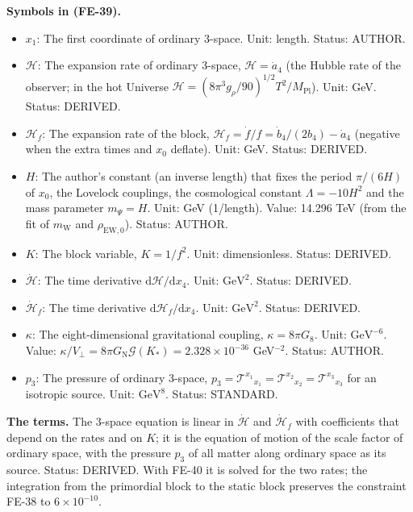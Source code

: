 \documentclass[
  10pt,
]{article}
\providecommand{\tightlist}{%
  \setlength{\itemsep}{0pt}\setlength{\parskip}{0pt}}
\begin{document}
\textbf{Symbols in (FE-39).}

\begin{itemize}
\tightlist
\item
  \(x_1\): The first coordinate of ordinary 3-space. Unit: length.
  Status: AUTHOR.
\item
  \(\mathcal{H}\): The expansion rate of ordinary 3-space,
  \(\mathcal{H} = \dot a_4\) (the Hubble rate of the observer; in the
  hot Universe
  \(\mathcal{H} = (8\pi^3g_\rho/90)^{1/2}T^2/M_{\mathrm{Pl}}\)). Unit:
  GeV. Status: DERIVED.
\item
  \(\mathcal{H}_f\): The expansion rate of the block,
  \(\mathcal{H}_f = \dot f/f = \dot b_4/(2b_4) - \dot a_4\) (negative
  when the extra times and \(x_0\) deflate). Unit: GeV. Status: DERIVED.
\item
  \(H\): The author's constant (an inverse length) that fixes the period
  \(\pi/(6H)\) of \(x_0\), the Lovelock couplings, the cosmological
  constant \(\Lambda = -10H^2\) and the mass parameter \(m_\Psi = H\).
  Unit: GeV (1/length). Value: 14.296 TeV (from the fit of
  \(m_{\mathrm{W}}\) and \(\rho_{\mathrm{EW},0}\)). Status: AUTHOR.
\item
  \(K\): The block variable, \(K = 1/f^2\). Unit: dimensionless. Status:
  DERIVED.
\item
  \(\dot{\mathcal{H}}\): The time derivative
  \(\mathrm{d}\mathcal{H}/\mathrm{d}x_4\). Unit: \(\mathrm{GeV}^{2}\).
  Status: DERIVED.
\item
  \(\dot{\mathcal{H}}_f\): The time derivative
  \(\mathrm{d}\mathcal{H}_f/\mathrm{d}x_4\). Unit: \(\mathrm{GeV}^{2}\).
  Status: DERIVED.
\item
  \(\kappa\): The eight-dimensional gravitational coupling,
  \(\kappa = 8\pi G_8\). Unit: \(\mathrm{GeV}^{-6}\). Value:
  \(\kappa/V_\perp = 8\pi G_{\mathrm{N}}\mathcal{G}(K_*) = 2.328\times10^{-36}\)
  GeV\(^{-2}\). Status: AUTHOR.
\item
  \(p_3\): The pressure of ordinary 3-space,
  \(p_3 = \mathcal{T}^{x_1}{}_{x_1} = \mathcal{T}^{x_2}{}_{x_2} = \mathcal{T}^{x_3}{}_{x_3}\)
  for an isotropic source. Unit: \(\mathrm{GeV}^{8}\). Status: STANDARD.
\end{itemize}

\textbf{The terms.} The 3-space equation is linear in
\(\dot{\mathcal{H}}\) and \(\dot{\mathcal{H}}_f\) with coefficients that
depend on the rates and on \(K\); it is the equation of motion of the
scale factor of ordinary space, with the pressure \(p_3\) of all matter
along ordinary space as its source. Status: DERIVED. With FE-40 it is
solved for the two rates; the integration from the primordial block to
the static block preserves the constraint FE-38 to \(6\times10^{-10}\).
\end{document}
